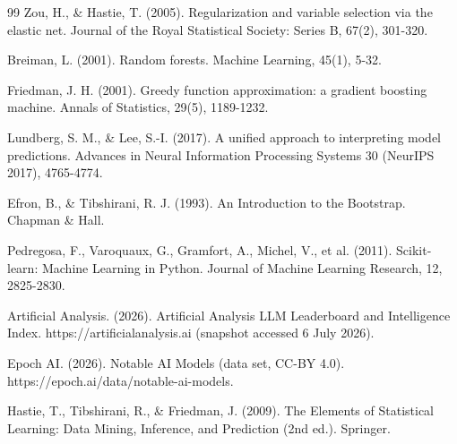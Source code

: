 \begin{thebibliography}{99}
 Zou, H., \& Hastie, T. (2005). Regularization and variable selection via the elastic net. Journal of the Royal Statistical Society: Series B, 67(2), 301-320.

 Breiman, L. (2001). Random forests. Machine Learning, 45(1), 5-32.

 Friedman, J. H. (2001). Greedy function approximation: a gradient boosting machine. Annals of Statistics, 29(5), 1189-1232.

 Lundberg, S. M., \& Lee, S.-I. (2017). A unified approach to interpreting model predictions. Advances in Neural Information Processing Systems 30 (NeurIPS 2017), 4765-4774.

 Efron, B., \& Tibshirani, R. J. (1993). An Introduction to the Bootstrap. Chapman \& Hall.

 Pedregosa, F., Varoquaux, G., Gramfort, A., Michel, V., et al. (2011). Scikit-learn: Machine Learning in Python. Journal of Machine Learning Research, 12, 2825-2830.

 Artificial Analysis. (2026). Artificial Analysis LLM Leaderboard and Intelligence Index. https://artificialanalysis.ai (snapshot accessed 6 July 2026).

 Epoch AI. (2026). Notable AI Models (data set, CC-BY 4.0). https://epoch.ai/data/notable-ai-models.

 Hastie, T., Tibshirani, R., \& Friedman, J. (2009). The Elements of Statistical Learning: Data Mining, Inference, and Prediction (2nd ed.). Springer.
\end{thebibliography}
